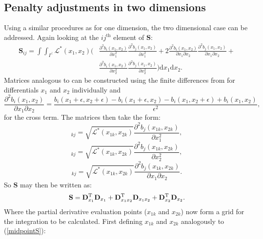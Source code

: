 \subsection{Penalty adjustments in two dimensions}
\label{cor-r41}

Using a similar procedures as for one dimension, the two dimensional case can be addressed. Again looking at the $ij^\text{th}$ element of $\mathbf{S}$:
\begin{align*}
\mathbf{S}_{ij}= \int\int_{\Gamma^\prime} \mathcal{L}^*(x_1,x_2) \Bigg ( & \frac{\partial^2 b_i(x_1,x_2)}{\partial x_1^2}\frac{\partial^2 b_j(x_1,x_2)}{\partial x_1^2}+2\frac{\partial^2 b_i(x_1,x_2)}{\partial x_1 \partial x_2}\frac{\partial^2 b_j(x_1,x_2)}{\partial x_1 \partial x_2}+ \\ 
& \frac{\partial^2 b_i(x_1,x_2)}{\partial x_2^2}\frac{\partial^2 b_j(x_1,x_2)}{\partial x_2^2} \Bigg )  \text{d}x_1\text{d}x_2.
\end{align*}
Matrices analogous to  can be constructed using the finite differences from  for differentials $x_1$ and $x_2$ individually and
\begin{equation*}
\frac{\partial^2 b_i(x_1,x_2)}{\partial x_1 \partial x_2} = \frac{ b_i(x_1+\epsilon,x_2+\epsilon) - b_i(x_1+\epsilon,x_2) - b_i(x_1,x_2+\epsilon) + b_i(x_1,x_2)}{\epsilon^2},
\end{equation*}
for the cross term. The matrices then take the form:
\begin{equation*}
[\mathbf{D}_{x_1}]_{kj}=\sqrt{\mathcal{L}^*(x_{1k},x_{2k})} \frac{\partial^2 b_j(x_{1k},x_{2k})}{\partial x_1^2},
\end{equation*}
\begin{equation*}
[\mathbf{D}_{x_2}]_{kj}=\sqrt{\mathcal{L}^*(x_{1k},x_{2k})} \frac{\partial^2 b_j(x_{1k},x_{2k})}{\partial x_2^2},
\end{equation*}
\begin{equation*}
[\mathbf{D}_{x_1 x_2}]_{kj}=\sqrt{\mathcal{L}^*(x_{1k},x_{2k})} \frac{\partial^2 b_j(x_{1k},x_{2k})}{\partial x_1 \partial x_2}.
\end{equation*}
So $\mathbf{S}$ may then be written as:
\begin{equation*}
\mathbf{S}=\mathbf{D}_{x_1}^{\text{T}}\mathbf{D}_{x_1} + \mathbf{D}_{x_1 x_2}^{\text{T}}\mathbf{D}_{x_1 x_2} + \mathbf{D}_{x_2}^{\text{T}}\mathbf{D}_{x_2}.
\end{equation*}
Where the partial derivative evaluation points ($x_{1k}$ and $x_{2k}$) now form a grid for the integration to be calculated. First defining $x_{1k}$ and $x_{2k}$ analogously to (\ref{midpointS}):
